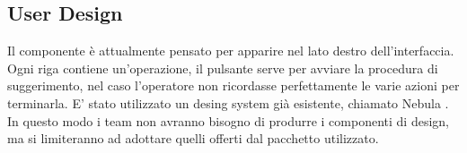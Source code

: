 \subsection{User Design}
Il componente è attualmente pensato per apparire nel lato destro dell'interfaccia.
Ogni riga contiene un'operazione, il pulsante serve per avviare la procedura di suggerimento, nel caso 
l'operatore non ricordasse perfettamente le varie azioni per terminarla.
E' stato utilizzato un desing system già esistente, chiamato Nebula \cite{nebula}.
In questo modo i team non avranno bisogno di produrre i componenti di design, ma si limiteranno ad adottare
quelli offerti dal pacchetto utilizzato.

